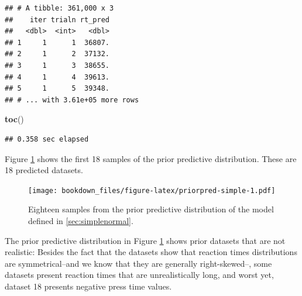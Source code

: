 \documentclass[12pt,]{krantz}
\newenvironment{Shaded}{\begin{snugshade}}{\end{snugshade}}
\newcommand{\DataTypeTok}[1]{\textcolor[rgb]{0.13,0.29,0.53}{#1}}
\newcommand{\DecValTok}[1]{\textcolor[rgb]{0.00,0.00,0.81}{#1}}
\newcommand{\KeywordTok}[1]{\textcolor[rgb]{0.13,0.29,0.53}{\textbf{#1}}}
\newcommand{\NormalTok}[1]{#1}
\newcommand{\OperatorTok}[1]{\textcolor[rgb]{0.81,0.36,0.00}{\textbf{#1}}}
\newcommand{\StringTok}[1]{\textcolor[rgb]{0.31,0.60,0.02}{#1}}
\theoremstyle{definition}
\theoremstyle{definition}
\theoremstyle{definition}
\theoremstyle{remark}
\begin{document}
\begin{verbatim}
## # A tibble: 361,000 x 3
##    iter trialn rt_pred
##   <dbl>  <int>   <dbl>
## 1     1      1  36807.
## 2     1      2  37132.
## 3     1      3  38655.
## 4     1      4  39613.
## 5     1      5  39348.
## # ... with 3.61e+05 more rows
\end{verbatim}

\begin{Shaded}
\begin{Highlighting}[]
\KeywordTok{toc}\NormalTok{()}
\end{Highlighting}
\end{Shaded}

\begin{verbatim}
## 0.358 sec elapsed
\end{verbatim}

Figure \ref{fig:priorpred-simple} shows the first 18 samples of the prior predictive distribution. These are 18 predicted datasets.



\begin{Shaded}
\end{Shaded}

\begin{figure}
\centering
\texttt{[image: bookdown\_files/figure-latex/priorpred-simple-1.pdf]}
\caption{\label{fig:priorpred-simple}Eighteen samples from the prior predictive distribution of the model defined in \ref{sec:simplenormal}.}
\end{figure}

The prior predictive distribution in Figure \ref{fig:priorpred-simple} shows prior datasets that are not realistic: Besides the fact that the datasets show that reaction times distributions are symmetrical--and we know that they are generally right-skewed--, some datasets present reaction times that are unrealistically long, and worst yet, dataset 18 presents negative press time values.
\end{document}
